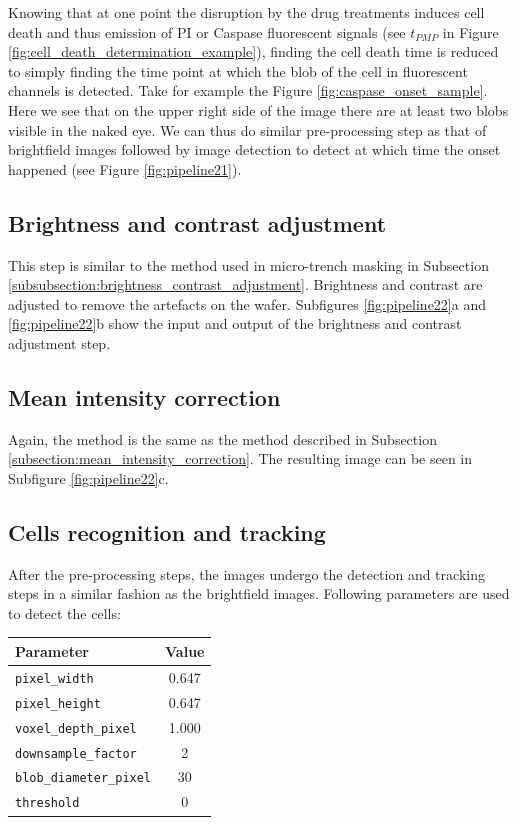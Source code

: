 \documentclass[pdftex,12pt,a4paper]{report}
\begin{document}
Knowing that at one point the disruption by the drug treatments induces cell death and thus emission of PI or Caspase fluorescent signals (see $t_{PMP}$ in Figure \ref{fig:cell_death_determination_example}), finding the cell death time is reduced to simply finding the time point at which the blob of the cell in fluorescent channels is detected. Take for example the Figure \ref{fig:caspase_onset_sample}. Here we see that on the upper right side of the image there are at least two blobs visible in the naked eye. We can thus do similar pre-processing step as that of brightfield images followed by image detection to detect at which time the onset happened (see Figure \ref{fig:pipeline21}).

\subsection{Brightness and contrast adjustment}

This step is similar to the method used in micro-trench masking in Subsection \ref{subsubsection:brightness_contrast_adjustment}. Brightness and contrast are adjusted to remove the artefacts on the wafer. Subfigures \ref{fig:pipeline22}a and \ref{fig:pipeline22}b show the input and output of the brightness and contrast adjustment step.

\subsection{Mean intensity correction}

Again, the method is the same as the method described in Subsection \ref{subsection:mean_intensity_correction}. The resulting image can be seen in Subfigure \ref{fig:pipeline22}c.

\subsection{Cells recognition and tracking}

After the pre-processing steps, the images undergo the detection and tracking steps in a similar fashion as the brightfield images. Following parameters are used to detect the cells:

\begin{table}[H]
\centering
\begin{tabular}[t]{ l | c }
\hline
Parameter & Value \\
\hline\hline
\texttt{pixel\_width} & 0.647 \\
\texttt{pixel\_height} & 0.647 \\
\texttt{voxel\_depth\_pixel} & 1.000 \\
\texttt{downsample\_factor} & 2 \\
\texttt{blob\_diameter\_pixel} & 30 \\
\texttt{threshold} & 0 \\
\hline
\end{tabular}
\end{table}
\end{document}
